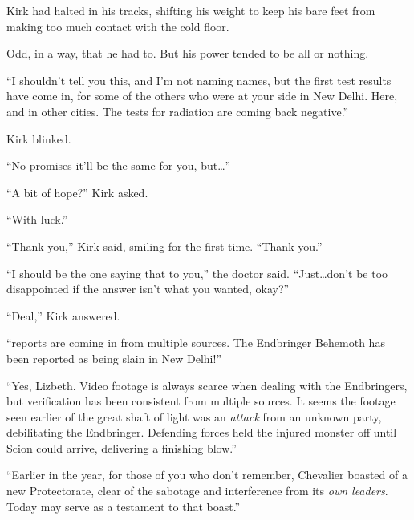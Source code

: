 Kirk had halted in his tracks, shifting his weight to keep his bare feet from making too much contact with the cold floor.



Odd, in a way, that he had to.  But his power tended to be all or nothing.



``I shouldn't tell you this, and I'm not naming names, but the first test results have come in, for some of the others who were at your side in New Delhi.  Here, and in other cities.  The tests for radiation are coming back negative.''



Kirk blinked.



``No promises it'll be the same for you, but\ldots''



``A bit of hope?'' Kirk asked.



``With luck.''



``Thank you,'' Kirk said, smiling for the first time.  ``Thank you.''



``I should be the one saying that to you,'' the doctor said.  ``Just\ldots don't be too disappointed if the answer isn't what you wanted, okay?''



``Deal,'' Kirk answered.



\blacksquare



``\ldotsfurther reports are coming in from multiple sources.  The Endbringer Behemoth has been reported as being slain in New Delhi!''



``Yes, Lizbeth.  Video footage is always scarce when dealing with the Endbringers, but verification has been consistent from multiple sources.  It seems the footage seen earlier of the great shaft of light was an \emph{attack} from an unknown party, debilitating the Endbringer.  Defending forces held the injured monster off until Scion could arrive, delivering a finishing blow.''



``Earlier in the year, for those of you who don't remember, Chevalier boasted of a new Protectorate, clear of the sabotage and interference from its \emph{own leaders}.  Today may serve as a testament to that boast.''



